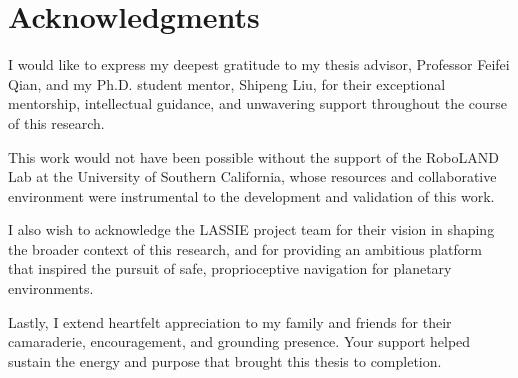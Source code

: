 \chapter*{Acknowledgments}


I would like to express my deepest gratitude to my thesis advisor, Professor Feifei Qian, and my Ph.D. student mentor, Shipeng Liu, for their exceptional mentorship, intellectual guidance, and unwavering support throughout the course of this research.

This work would not have been possible without the support of the RoboLAND Lab at the University of Southern California, whose resources and collaborative environment were instrumental to the development and validation of this work.

I also wish to acknowledge the LASSIE project team for their vision in shaping the broader context of this research, and for providing an ambitious platform that inspired the pursuit of safe, proprioceptive navigation for planetary environments.

Lastly, I extend heartfelt appreciation to my family and friends for their camaraderie, encouragement, and grounding presence. Your support helped sustain the energy and purpose that brought this thesis to completion.